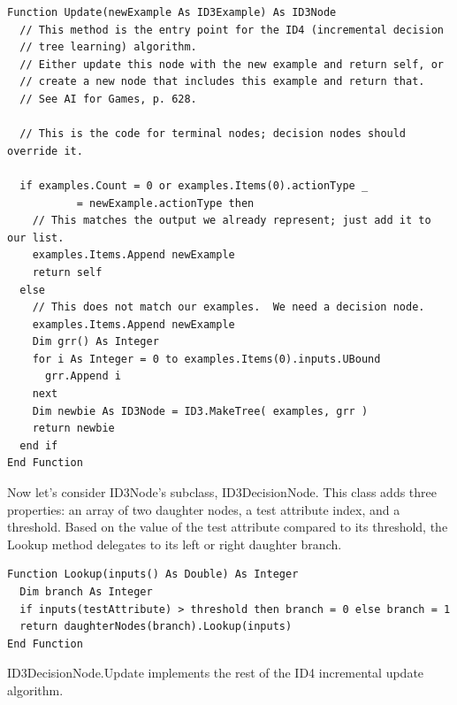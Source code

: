 \documentclass{article}
\begin{document}
\begin{lstlisting}
Function Update(newExample As ID3Example) As ID3Node
  // This method is the entry point for the ID4 (incremental decision
  // tree learning) algorithm.
  // Either update this node with the new example and return self, or
  // create a new node that includes this example and return that.
  // See AI for Games, p. 628.
  
  // This is the code for terminal nodes; decision nodes should override it.
  
  if examples.Count = 0 or examples.Items(0).actionType _
           = newExample.actionType then
    // This matches the output we already represent; just add it to our list.
    examples.Items.Append newExample
    return self
  else
    // This does not match our examples.  We need a decision node.
    examples.Items.Append newExample
    Dim grr() As Integer
    for i As Integer = 0 to examples.Items(0).inputs.UBound
      grr.Append i
    next
    Dim newbie As ID3Node = ID3.MakeTree( examples, grr )
    return newbie
  end if
End Function
\end{lstlisting}

Now let's consider ID3Node's subclass, ID3DecisionNode.  This class adds three properties: an array of two daughter nodes, a test attribute index, and a threshold.  Based on the value of the test attribute compared to its threshold, the Lookup method delegates to its left or right daughter branch.

\begin{lstlisting}
Function Lookup(inputs() As Double) As Integer
  Dim branch As Integer
  if inputs(testAttribute) > threshold then branch = 0 else branch = 1
  return daughterNodes(branch).Lookup(inputs)
End Function
\end{lstlisting}

ID3DecisionNode.Update implements the rest of the ID4 incremental update algorithm.
\end{document}
